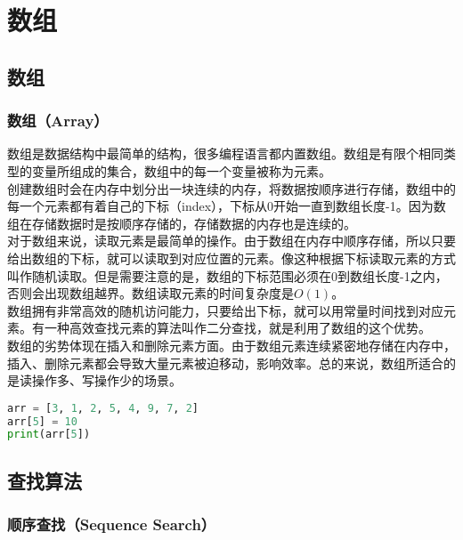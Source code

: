 \chapter{数组}

\section{数组}

\subsection{数组（Array）}

数组是数据结构中最简单的结构，很多编程语言都内置数组。数组是有限个相同类型的变量所组成的集合，数组中的每一个变量被称为元素。\\

创建数组时会在内存中划分出一块连续的内存，将数据按顺序进行存储，数组中的每一个元素都有着自己的下标（index），下标从0开始一直到数组长度-1。因为数组在存储数据时是按顺序存储的，存储数据的内存也是连续的。\\

对于数组来说，读取元素是最简单的操作。由于数组在内存中顺序存储，所以只要给出数组的下标，就可以读取到对应位置的元素。像这种根据下标读取元素的方式叫作随机读取。但是需要注意的是，数组的下标范围必须在0到数组长度-1之内，否则会出现数组越界。数组读取元素的时间复杂度是$ O(1) $。\\

数组拥有非常高效的随机访问能力，只要给出下标，就可以用常量时间找到对应元素。有一种高效查找元素的算法叫作二分查找，就是利用了数组的这个优势。\\

数组的劣势体现在插入和删除元素方面。由于数组元素连续紧密地存储在内存中，插入、删除元素都会导致大量元素被迫移动，影响效率。总的来说，数组所适合的是读操作多、写操作少的场景。\\


\begin{lstlisting}[language=Python]
arr = [3, 1, 2, 5, 4, 9, 7, 2]
arr[5] = 10
print(arr[5])
\end{lstlisting}

\newpage

\section{查找算法}

\subsection{顺序查找（Sequence Search）}

